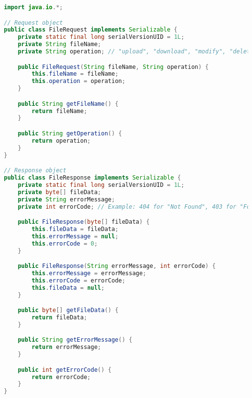 \documentclass[12pt]{article}
\begin{document}
\begin{lstlisting}[language=Java]
import java.io.*;

// Request object
public class FileRequest implements Serializable {
    private static final long serialVersionUID = 1L;
    private String fileName;
    private String operation; // "upload", "download", "modify", "delete"

    public FileRequest(String fileName, String operation) {
        this.fileName = fileName;
        this.operation = operation;
    }

    public String getFileName() {
        return fileName;
    }

    public String getOperation() {
        return operation;
    }
}

// Response object
public class FileResponse implements Serializable {
    private static final long serialVersionUID = 1L;
    private byte[] fileData;
    private String errorMessage;
    private int errorCode; // Example: 404 for "Not Found", 403 for "Forbidden"

    public FileResponse(byte[] fileData) {
        this.fileData = fileData;
        this.errorMessage = null;
        this.errorCode = 0;
    }

    public FileResponse(String errorMessage, int errorCode) {
        this.errorMessage = errorMessage;
        this.errorCode = errorCode;
        this.fileData = null;
    }

    public byte[] getFileData() {
        return fileData;
    }

    public String getErrorMessage() {
        return errorMessage;
    }

    public int getErrorCode() {
        return errorCode;
    }
}
\end{lstlisting}

\vspace{1in} %
\end{document}

